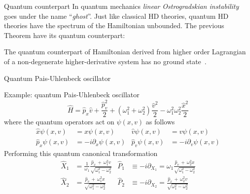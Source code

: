 \begin{frame}{Quantum counterpart}
  In quantum mechanics \emph{linear Ostrogradskian instability} goes under the
  name ``\emph{ghost}''. Just like classical HD theories, quantum HD theories
  have the spectrum of the Hamiltonian unbounded. The previous Theorem have
  its quantum counterpart:
  \vspace{2.0em}
  \begin{theorem} \vspace{0.5em}
    The quantum counterpart of Hamiltonian derived from higher order
    Lagrangian of a non-degenerate higher-derivative system has no ground
    state~\cite{Smilga17}.
  \end{theorem}
\end{frame}

\begin{frame}{Quantum Pais-Uhlenbeck oscillator}
  \begin{block}{Example: quantum Pais-Uhlenbeck oscillator}
    \vspace{0.2em}
    \begin{equation*}
      \hat{H} = \hat{p}_x \hat{v} + \frac{\hat{p}_v^2}{2}
      + \left(\omega_1^2 + \omega_2^2\right)\frac{\hat{v}^2}{2}
      - \omega_1^2\omega_2^2 \frac{\hat{x}^2}{2}
    \end{equation*}
    where the quantum operators act on $\psi(x, v)$ as follows
    \begin{align*}
      \hat{x}\psi(x, v) &= x \psi(x, v) &
      \hat{v}\psi(x, v) &= v \psi(x, v) \\
      \hat{p}_x\psi(x, v) &= -i\partial_x \psi(x, v) &
      \hat{p}_v\psi(x, v) &= -i\partial_v \psi(x, v)
    \end{align*}
    Performing this quantum canonical transformation~\cite{Mannheim05}
    \begin{align*}
      \hat{X}_1 &= \frac{1}{\omega_1}
        \frac{\hat{p}_x \, + \,  \omega_1^2 v} {\sqrt{\omega_1^2-\omega_2^2}} &
      \hat{P}_1 & \equiv -i \partial_{X_1} = \omega_1
        \frac{\hat{p}_v \, + \,  \omega_2^2 x} {\sqrt{\omega_1^2-\omega_2^2}} \\
      \hat{X}_2 &=
        \frac{\hat{p}_v \, + \,  \omega_1^2 x} {\sqrt{\omega_1^2-\omega_2^2}} &
      \hat{P}_2 & \equiv -i \partial_{X_2} =
        \frac{\hat{p}_x \, + \,  \omega_2^2 v} {\sqrt{\omega_1^2-\omega_2^2}}
    \end{align*}
  \end{block}
\end{frame}

